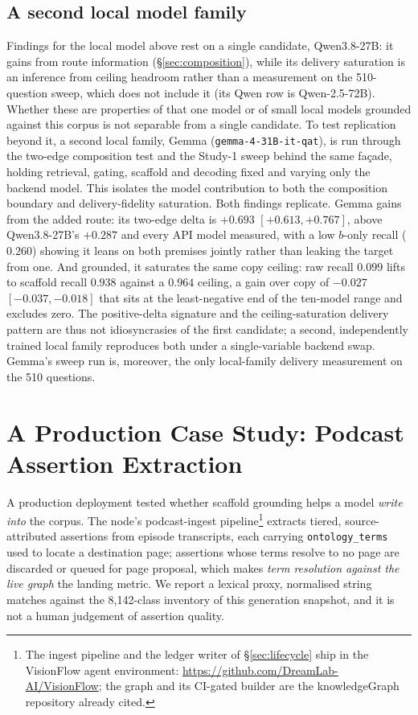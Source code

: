 \documentclass[10pt,twocolumn]{article}
\begin{document}


\subsection{A second local model family}\label{sec:gemma}
Findings for the local model above rest on a single candidate, Qwen3.8-27B: it gains from route information
(\S\ref{sec:composition}), while its delivery saturation is an inference from ceiling headroom
rather than a measurement on the 510-question sweep, which does not include it (its Qwen row is
Qwen-2.5-72B). Whether these are properties of that one model or of small local models grounded
against this corpus is not separable from a single candidate. To test replication beyond it, a
second local family, Gemma (\texttt{gemma-4-31B-it-qat}), is run through the two-edge composition
test and the Study-1 sweep behind the same fa\c{c}ade, holding retrieval, gating, scaffold and
decoding fixed and varying only the backend model. This isolates the model contribution to both
the composition boundary and delivery-fidelity saturation. Both findings replicate. Gemma gains from the added route: its two-edge delta is $+0.693$ $[+0.613,+0.767]$, above
Qwen3.8-27B's $+0.287$ and every API model measured, with a low $b$-only recall ($0.260$) showing it
leans on both premises jointly rather than leaking the target from one. And grounded, it saturates
the same copy ceiling: raw recall $0.099$ lifts to scaffold recall $0.938$ against a $0.964$ ceiling,
a gain over copy of $-0.027$ $[-0.037,-0.018]$ that sits at the least-negative end of the ten-model
range and excludes zero. The positive-delta signature and the ceiling-saturation delivery pattern are thus
not idiosyncrasies of the first candidate; a second, independently trained local family reproduces
both under a single-variable backend swap. Gemma's sweep run is, moreover, the only local-family
delivery measurement on the 510 questions.


\section{A Production Case Study: Podcast Assertion Extraction}\label{sec:casestudy}
A production deployment tested whether scaffold grounding helps a model \emph{write into} the
corpus. The node's podcast-ingest pipeline\footnote{The ingest pipeline and the ledger writer of
\S\ref{sec:lifecycle} ship in the VisionFlow agent environment:
\url{https://github.com/DreamLab-AI/VisionFlow}; the graph and its CI-gated builder are the
knowledgeGraph repository already cited.} extracts tiered, source-attributed assertions from
episode transcripts, each carrying \texttt{ontology\_terms} used to locate a destination page;
assertions whose terms resolve to no page are discarded or queued for page proposal, which makes
\emph{term resolution against the live graph} the landing metric. We report a lexical proxy,
normalised string matches against the 8{,}142-class inventory of this generation snapshot, and it is
not a human judgement of assertion quality.
\end{document}
